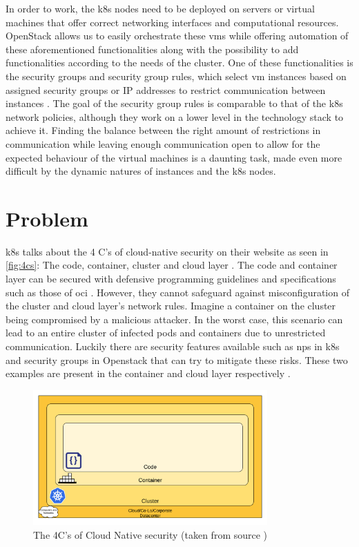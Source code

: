 In order to work, the \acrshort{k8s} nodes need to be deployed on servers or virtual machines that offer correct networking interfaces and computational resources. OpenStack allows us to easily orchestrate these \acrshort{vm}s while offering automation of these aforementioned functionalities along with the possibility to add functionalities according to the needs of the cluster. One of these functionalities is the security groups and security group rules, which select \acrshort{vm} instances based on assigned security groups or IP addresses to restrict communication between instances \cite{sg} \cite{sgrule}. The goal of the security group rules is comparable to that of the \acrshort{k8s} network policies, although they work on a lower level in the technology stack to achieve it. Finding the balance between the right amount of restrictions in communication while leaving enough communication open to allow for the expected behaviour of the virtual machines is a daunting task, made even more difficult by the dynamic natures of instances and the \acrshort{k8s} nodes.


\section{Problem} \label{sec:problem}
\acrshort{k8s} talks about the 4 C’s of cloud-native security on their website as seen in \autoref{fig:4cs}: The code, container, cluster and cloud layer \cite{4cs}. The code and container layer can be secured with defensive programming guidelines \cite{defensiveprogramming} and specifications such as those of \acrshort{oci} \cite{OCI}. However, they cannot safeguard against misconfiguration of the cluster and cloud layer's network rules. Imagine a container on the cluster being compromised by a malicious attacker. In the worst case, this scenario can lead to an entire cluster of infected pods and containers due to unrestricted communication. Luckily there are security features available such as \acrshort{np}s in \acrshort{k8s} and security groups in Openstack that can try to mitigate these risks. These two examples are present in the container and cloud layer respectively \cite{nps} \cite{secgroups}.
\\[10pt]

\begin{figure}[htbp]
  \centering
  \includegraphics[width=0.8\textwidth]{images/4c.png}
  \caption{The 4C's of Cloud Native security (taken from source \cite{4cs})}
  \label{fig:4cs}
\end{figure}

